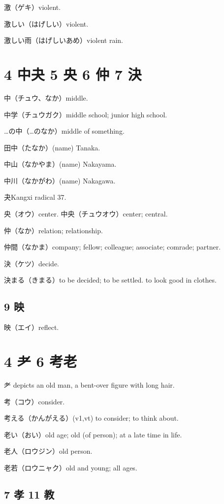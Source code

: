 激（ゲキ）violent.

激しい（はげしい）violent.

激しい雨（はげしいあめ）violent rain.

\section{4 中夬 5 央 6 仲 7 決}

中（チュウ、なか）middle.

中学（チュウガク）middle school; junior high school.

…の中（…のなか）middle of something.

田中（たなか）(name) Tanaka.

中山（なかやま）(name) Nakayama.

中川（なかがわ）(name) Nakagawa.

夬Kangxi radical 37.

央（オウ）center.
中央（チュウオウ）center; central.

仲（なか）relation; relationship.

仲間（なかま）company; fellow; colleague; associate; comrade; partner.

決（ケツ）decide.

決まる（きまる）to be decided; to be settled. to look good in clothes.

\subsection{9 映}

映（エイ）reflect.

\section{4 耂 6 考老}

耂 depicts an old man, a bent-over figure with long hair.

考（コウ）consider.

考える（かんがえる）(v1,vt) to consider; to think about.

老い（おい）old age; old (of person); at a late time in life.

老人（ロウジン）old person.

老若（ロウニャク）old and young; all ages.

\subsection{7 孝 11 教}

